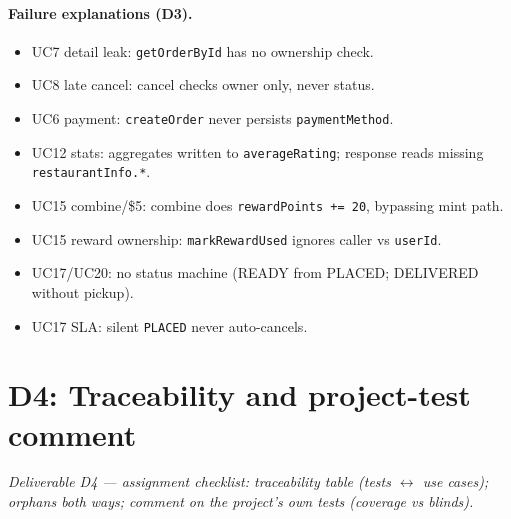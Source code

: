 \paragraph{Failure explanations (D3).}
\begin{itemize}
\item UC7 detail leak: \texttt{getOrderById} has no ownership check.
\item UC8 late cancel: cancel checks owner only, never status.
\item UC6 payment: \texttt{createOrder} never persists \texttt{paymentMethod}.
\item UC12 stats: aggregates written to \texttt{averageRating}; response reads missing \texttt{restaurantInfo.*}.
\item UC15 combine/\$5: combine does \texttt{rewardPoints += 20}, bypassing mint path.
\item UC15 reward ownership: \texttt{markRewardUsed} ignores caller vs \texttt{userId}.
\item UC17/UC20: no status machine (READY from PLACED; DELIVERED without pickup).
\item UC17 SLA: silent \texttt{PLACED} never auto-cancels.
\end{itemize}

\section{D4: Traceability and project-test comment}
\label{sec:d4}
\textit{Deliverable D4 --- assignment checklist: traceability table (tests $\leftrightarrow$ use cases);
orphans both ways; comment on the project's own tests (coverage vs blinds).}

